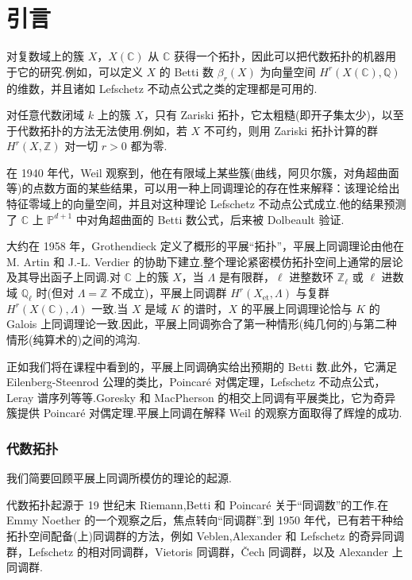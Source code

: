 \chapter{引言}\label{sec:1}

对复数域上的簇 $X$，$X(\mathbb{C})$ 从 $\mathbb{C}$ 获得一个拓扑，因此可以把代数拓扑的机器用于它的研究.例如，可以定义 $X$ 的 Betti 数 $\beta_r(X)$ 为向量空间 $H^{r}(X(\mathbb{C}), \mathbb{Q})$ 的维数，并且诸如 Lefschetz 不动点公式之类的定理都是可用的.

对任意代数闭域 $k$ 上的簇 $X$，只有 Zariski 拓扑，它太粗糙(即开子集太少)，以至于代数拓扑的方法无法使用.例如，若 $X$ 不可约，则用 Zariski 拓扑计算的群 $H^{r}(X, \mathbb{Z})$ 对一切 $r > 0$ 都为零.

在 1940 年代，Weil 观察到，他在有限域上某些簇(曲线，阿贝尔簇，对角超曲面等)的点数方面的某些结果，可以用一种上同调理论的存在性来解释：该理论给出特征零域上的向量空间，并且对这种理论 Lefschetz 不动点公式成立.他的结果预测了 $\mathbb{C}$ 上 $\mathbb{P}^{d+1}$ 中对角超曲面的 Betti 数公式，后来被 Dolbeault 验证.

大约在 1958 年，Grothendieck 定义了概形的平展``拓扑''，平展上同调理论由他在 M. Artin 和 J.-L. Verdier 的协助下建立.整个理论紧密模仿拓扑空间上通常的层论及其导出函子上同调.对 $\mathbb{C}$ 上的簇 $X$，当 $\Lambda$ 是有限群，$\ell$ 进整数环 $\mathbb{Z}_{\ell}$ 或 $\ell$ 进数域 $\mathbb{Q}_{\ell}$ 时(但对 $\Lambda = \mathbb{Z}$ 不成立)，平展上同调群 $H^{r}(X_{\mathrm{et}}, \Lambda)$ 与复群 $H^{r}(X(\mathbb{C}), \Lambda)$ 一致.当 $X$ 是域 $K$ 的谱时，$X$ 的平展上同调理论恰与 $K$ 的 Galois 上同调理论一致.因此，平展上同调弥合了第一种情形(纯几何的)与第二种情形(纯算术的)之间的鸿沟.

正如我们将在课程中看到的，平展上同调确实给出预期的 Betti 数.此外，它满足 Eilenberg-Steenrod 公理的类比，Poincar\'e 对偶定理，Lefschetz 不动点公式，Leray 谱序列等等.Goresky 和 MacPherson 的相交上同调有平展类比，它为奇异簇提供 Poincar\'e 对偶定理.平展上同调在解释 Weil 的观察方面取得了辉煌的成功.

\subsection*{代数拓扑}

我们简要回顾平展上同调所模仿的理论的起源.

代数拓扑起源于 19 世纪末 Riemann,Betti 和 Poincar\'e 关于``同调数''的工作.在 Emmy Noether 的一个观察之后，焦点转向``同调群''.到 1950 年代，已有若干种给拓扑空间配备(上)同调群的方法，例如 Veblen,Alexander 和 Lefschetz 的奇异同调群，Lefschetz 的相对同调群，Vietoris 同调群，\v{C}ech 同调群，以及 Alexander 上同调群.

